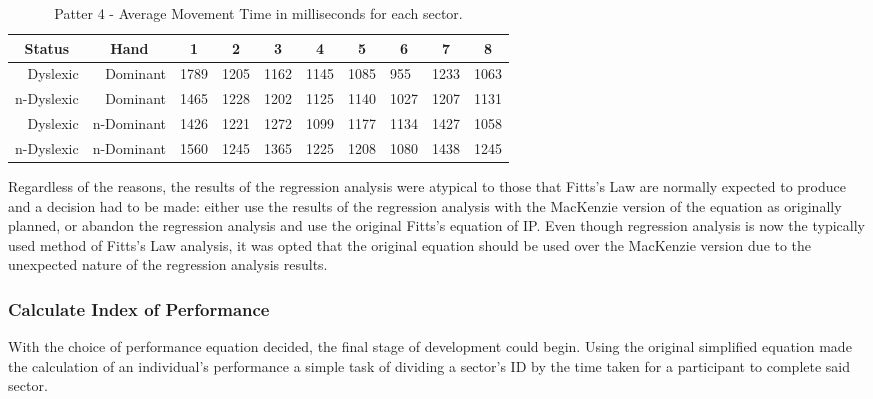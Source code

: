 		\begin{table}[]
			\centering
			\caption{Patter 4 - Average Movement Time in milliseconds for each sector.}
			\label{tab_pat_4_mt}
			\begin{tabularx}{\textwidth}{|r|r|X|X|X|X|X|X|X|X|}
				\hline
				\multicolumn{1}{|c|}{\textbf{Status}} & \multicolumn{1}{c|}{\textbf{Hand}} & \multicolumn{1}{c|}{\textbf{1}} & \multicolumn{1}{c|}{\textbf{2}} & \multicolumn{1}{c|}{\textbf{3}} & \multicolumn{1}{c|}{\textbf{4}} & \multicolumn{1}{c|}{\textbf{5}} & \multicolumn{1}{c|}{\textbf{6}} & \multicolumn{1}{c|}{\textbf{7}} & \multicolumn{1}{c|}{\textbf{8}} \\ \hline
				Dyslexic                              & Dominant                           & 1789       & 1205       & 1162       & 1145       & 1085       & 955        & 1233       & 1063       \\ \hline
				n-Dyslexic                          & Dominant                           & 1465       & 1228       & 1202       & 1125       & 1140       & 1027       & 1207       & 1131       \\ \hline
				Dyslexic                              & n-Dominant                       & 1426       & 1221       & 1272       & 1099       & 1177       & 1134       & 1427       & 1058       \\ \hline
				n-Dyslexic                          & n-Dominant                       & 1560       & 1245       & 1365       & 1225       & 1208       & 1080       & 1438       & 1245       \\ \hline
			\end{tabularx}
		\end{table}
	
			Regardless of the reasons, the results of the regression analysis were atypical to those that Fitts’s Law are normally expected to produce and a decision had to be made: either use the results of the regression analysis with the MacKenzie version of the equation as originally planned, or abandon the regression analysis and use the original Fitts’s equation of IP. Even though regression analysis is now the typically used method of Fitts’s Law analysis, it was opted that the original equation should be used over the MacKenzie version due to the unexpected nature of the regression analysis results.
			
		\subsubsection{Calculate Index of Performance}
			With the choice of performance equation decided, the final stage of development could begin. Using the original simplified equation made the calculation of an individual's performance a simple task of dividing a sector’s ID by the time taken for a participant to complete said sector. 
		
